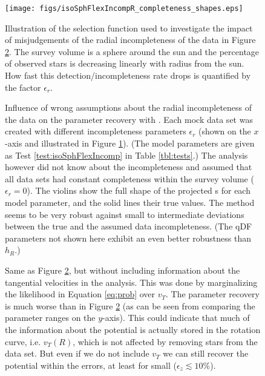 



\begin{figure}[!htbp]
\centering
\texttt{[image: figs/isoSphFlexIncompR\_completeness\_shapes.eps]}
\caption{Illustration of the selection function used to investigate the impact of misjudgements of the radial incompleteness of the data in Figure \ref{fig:isoSphFlexIncompR_violins}. The survey volume is a sphere around the sun and the percentage of observed stars is decreasing linearly with radius from the sun. How fast this detection/incompleteness rate drops is quantified by the factor $\epsilon_r$.} 
\label{fig:isoSphFlexIncompR_completeness_shapes}
\end{figure}


\begin{figure}[!htbp]
\centering
{}
\caption{Influence of wrong assumptions about the radial incompleteness of the data on the parameter recovery with \RM{}. Each mock data set was created with different incompleteness parameters $\epsilon_r$ (shown on the $x$-axis and illustrated in Figure \ref{fig:isoSphFlexIncompR_completeness_shapes}). (The model parameters are given as Test \ref{test:isoSphFlexIncomp} in Table \ref{tbl:tests}.) The analysis however did not know about the incompleteness and assumed that all data sets had constant completeness within the survey volume ($\epsilon_r = 0$). The violins show the full shape of the projected \pdf{}s for each model parameter, and the solid lines their true values. The \RM{} method seems to be very robust against small to intermediate deviations between the true and the assumed data incompleteness. (The qDF parameters not shown here exhibit an even better robustness than $h_R$.) } 
\label{fig:isoSphFlexIncompR_violins}
\end{figure}

\begin{figure}[!htbp]
\centering
{}
\caption{Same as Figure \ref{fig:isoSphFlexIncompR_violins}, but without including information about the tangential velocities in the analysis. This was done by marginalizing the likelihood in Equation \ref{eq:prob} over $v_T$. The parameter recovery is much worse than in Figure \ref{fig:isoSphFlexIncompR_violins} (as can be seen from comparing the parameter ranges on the $y$-axis). This could indicate that much of the information about the potential is actually stored in the rotation curve, i.e. $v_T(R)$, which is not affected by removing stars from the data set. But even if we do not include $v_T$ we can still recover the potential within the errors, at least for small ($\epsilon_z \lesssim 10\%$).} 
\label{fig:isoSphFlexIncompR_marginal_violins}
\end{figure}

